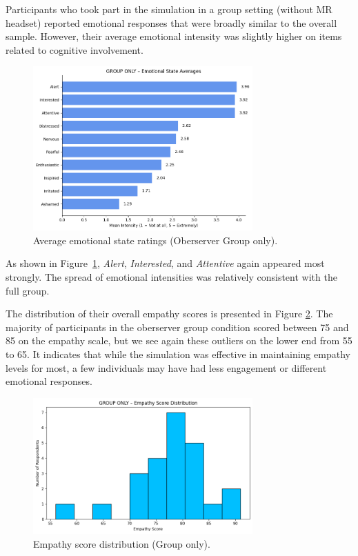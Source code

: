 Participants who took part in the simulation in a group setting (without MR headset) reported emotional responses that were broadly similar to the overall sample. However, their average emotional intensity was slightly higher on items related to cognitive involvement.

\begin{figure}[htbp]
    \centering
    \includegraphics[width=0.75\textwidth]{../../Figures/emotional-post-grp.png}
    \caption{Average emotional state ratings (Oberserver Group only).}
    \label{fig:emotional_post_group}
\end{figure}

As shown in Figure~\ref{fig:emotional_post_group}, \textit{Alert}, \textit{Interested}, and \textit{Attentive} again appeared most strongly. The spread of emotional intensities was relatively consistent with the full group.

\vspace{1em}

The distribution of their overall empathy scores is presented in Figure \ref{fig:empathy_group_post}. The majority of participants in the oberserver group condition scored between 75 and 85 on the empathy scale, but we see again these outliers on the lower end from 55 to 65. It indicates that while the simulation was effective in maintaining empathy levels for most, a few individuals may have had less engagement or different emotional responses. 


\begin{figure}[htbp]
    \centering
    \includegraphics[width=0.75\textwidth]{../../Figures/empathy-score-post-grp.png}
    \caption{Empathy score distribution (Group only).}
    \label{fig:empathy_group_post}
\end{figure}

